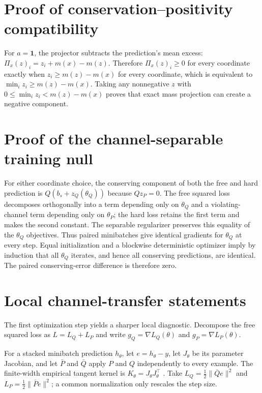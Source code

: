 \documentclass{article}
\begin{document}
\section{Proof of conservation--positivity compatibility}
\label{app:positivity}

For $a=\mathbf{1}$, the projector subtracts the prediction's mean excess:
$\Pi_x(z)_i=z_i+m(x)-m(z)$. Therefore $\Pi_x(z)_i\geq0$ for every coordinate exactly when
$z_i\geq m(z)-m(x)$ for every coordinate, which is equivalent to
$\min_i z_i\geq m(z)-m(x)$. Taking any nonnegative $z$ with
$0\leq\min_i z_i<m(z)-m(x)$ proves that exact mass projection can create a negative component.

\section{Proof of the channel-separable training null}
\label{app:training-null}

For either coordinate choice, the conserving component of both the free and hard prediction is
$Q(b_s+z_Q(\theta_Q))$ because $Qz_P=0$. The free squared loss decomposes orthogonally into a term
depending only on $\theta_Q$ and a violating-channel term depending only on $\theta_P$; the hard
loss retains the first term and makes the second constant. The separable regularizer preserves
this equality of the $\theta_Q$ objectives. Thus paired minibatches give identical gradients for
$\theta_Q$ at every step. Equal initialization and a blockwise deterministic optimizer imply by
induction that all $\theta_Q$ iterates, and hence all conserving predictions, are identical. The
paired conserving-error difference is therefore zero.

\section{Local channel-transfer statements}
\label{app:local-statements}

The first optimization step yields a sharper local diagnostic. Decompose the free squared loss as
$L=L_Q+L_P$ and write $g_Q=\nabla L_Q(\theta)$ and $g_P=\nabla L_P(\theta)$.

For a stacked minibatch prediction $h_\theta$, let $e=h_\theta-y$, let $J_\theta$ be its parameter
Jacobian, and let $\bar P$ and $\bar Q$ apply $P$ and $Q$ independently to every example. The
finite-width empirical tangent kernel is $K_\theta=J_\theta J_\theta^\top$
\citep{jacot2018ntk}. Take $L_Q=\tfrac12\lVert\bar Qe\rVert^2$ and
$L_P=\tfrac12\lVert\bar Pe\rVert^2$; a common normalization only rescales the step size.
\end{document}
